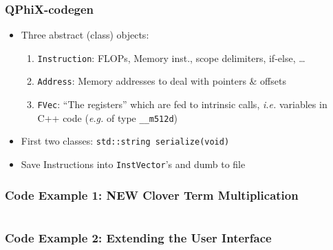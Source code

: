 \documentclass{beamer}
\begin{document}
  \begin{frame}[fragile]
    \frametitle{QPhiX-codegen}

    \begin{itemize}
      \item Three abstract (class) objects:
        \begin{enumerate}
          \item \texttt{Instruction}: FLOPs, Memory inst., scope delimiters, if-else, \dots
          \item \texttt{Address}: Memory addresses to deal with pointers \& offsets
          \item \texttt{FVec}: ``The registers'' which are fed to intrinsic calls, \textit{i.e.}
            variables in C++ code (\textit{e.g.} of type \texttt{\_\_m512d})
        \end{enumerate}

      \item First two classes: \;\; \texttt{std::string serialize(void)}
      \item Save Instructions into \texttt{InstVector}'s and dumb to file
    \end{itemize}

    \tiny
\end{frame}


  \begin{frame}[fragile]
    \frametitle{Code Example 1: NEW Clover Term Multiplication}
    \tiny

    \begin{columns}[T]
      \begin{column}{.5\textwidth}
      \end{column}
      \begin{column}{.5\textwidth}
      \end{column}
    \end{columns}

\end{frame}


\begin{frame}[fragile]
    \frametitle{Code Example 2: Extending the User Interface}
    \tiny
%
\end{frame}
\end{document}
